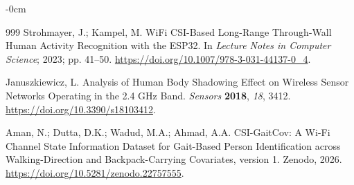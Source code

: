 \documentclass[sensors,article,submit,oneauthor]{Definitions/mdpi}
\begin{document}
\begin{adjustwidth}{-\extralength}{0cm}
{\begin{thebibliography}{999}
Strohmayer, J.; Kampel, M. WiFi CSI-Based Long-Range Through-Wall Human Activity Recognition with the ESP32. In {\em Lecture Notes in Computer Science}; 2023; pp. 41--50. \url{https://doi.org/10.1007/978-3-031-44137-0_4}.

Januszkiewicz, L. Analysis of Human Body Shadowing Effect on Wireless Sensor Networks Operating in the 2.4 GHz Band. {\em Sensors} {\bf 2018}, {\em 18}, 3412. \url{https://doi.org/10.3390/s18103412}.

Aman, N.; Dutta, D.K.; Wadud, M.A.; Ahmad, A.A. CSI-GaitCov: A Wi-Fi Channel State Information Dataset for Gait-Based Person Identification across Walking-Direction and Backpack-Carrying Covariates, version 1. Zenodo, 2026. \url{https://doi.org/10.5281/zenodo.22757555}.
\end{thebibliography}
}

\end{adjustwidth}
\end{document}
